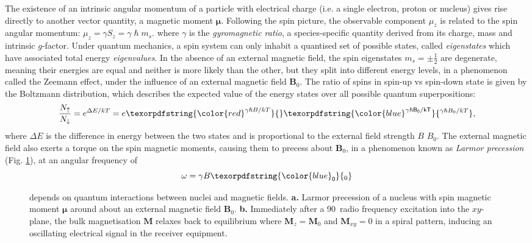 \documentclass[12pt,phd,a4paper,twoside]{ucl_thesis}
\providecommand{\DIFaddtex}[1]{{\protect\color{blue} \sf #1}} %
\providecommand{\DIFdeltex}[1]{{\protect\color{red} \scriptsize #1}} %
\providecommand{\DIFaddbegin}{} %
\providecommand{\DIFaddend}{} %
\providecommand{\DIFdelbegin}{} %
\providecommand{\DIFdelend}{} %
\providecommand{\DIFaddFL}[1]{\DIFadd{#1}} %
\providecommand{\DIFdelFL}[1]{\DIFdel{#1}} %
\providecommand{\DIFaddbeginFL}{} %
\providecommand{\DIFaddendFL}{} %
\providecommand{\DIFdelbeginFL}{} %
\providecommand{\DIFdelendFL}{} %
\providecommand{\DIFadd}[1]{\texorpdfstring{\DIFaddtex{#1}}{#1}} %
\providecommand{\DIFdel}[1]{\texorpdfstring{\DIFdeltex{#1}}{}} %
\newcommand{\DIFscaledelfig}{0.5}
\newlength{\DIFdelgraphicswidth} %
\newlength{\DIFdelgraphicsheight} %
\newcommand{\DIFaddincludegraphics}[2][]{{\color{blue}\fbox{\DIFOincludegraphics[#1]{#2}}}} %
\newcommand{\DIFdelincludegraphics}[2][]{%
\sbox{\DIFdelgraphicsbox}{\DIFOincludegraphics[#1]{#2}}%
\settoboxwidth{\DIFdelgraphicswidth}{\DIFdelgraphicsbox} %
\settoboxtotalheight{\DIFdelgraphicsheight}{\DIFdelgraphicsbox} %
\scalebox{\DIFscaledelfig}{%
\parbox[b]{\DIFdelgraphicswidth}{\usebox{\DIFdelgraphicsbox}\\[-\baselineskip] \rule{\DIFdelgraphicswidth}{0em}}\llap{\resizebox{\DIFdelgraphicswidth}{\DIFdelgraphicsheight}{%
\setlength{\unitlength}{\DIFdelgraphicswidth}%
\begin{picture}(1,1)%
\thicklines\linethickness{2pt} %
{\color[rgb]{1,0,0}\put(0,0){\framebox(1,1){}}}%
{\color[rgb]{1,0,0}\put(0,0){\line( 1,1){1}}}%
{\color[rgb]{1,0,0}\put(0,1){\line(1,-1){1}}}%
\end{picture}%
}\hspace*{3pt}}} %
} %
\DeclareRobustCommand{\DIFaddbegin}{\DIFOaddbegin \let\includegraphics\DIFaddincludegraphics} %
\DeclareRobustCommand{\DIFaddend}{\DIFOaddend \let\includegraphics\DIFOincludegraphics} %
\DeclareRobustCommand{\DIFdelbegin}{\DIFOdelbegin \let\includegraphics\DIFdelincludegraphics} %
\DeclareRobustCommand{\DIFdelend}{\DIFOaddend \let\includegraphics\DIFOincludegraphics} %
\DeclareRobustCommand{\DIFaddbeginFL}{\DIFOaddbeginFL \let\includegraphics\DIFaddincludegraphics} %
\DeclareRobustCommand{\DIFaddendFL}{\DIFOaddendFL \let\includegraphics\DIFOincludegraphics} %
\DeclareRobustCommand{\DIFdelbeginFL}{\DIFOdelbeginFL \let\includegraphics\DIFdelincludegraphics} %
\DeclareRobustCommand{\DIFdelendFL}{\DIFOaddendFL \let\includegraphics\DIFOincludegraphics} %
\begin{document}
The existence of an intrinsic angular momentum of a particle with electrical charge (i.e. a single electron, proton or nucleus) gives rise directly to another vector quantity, a magnetic moment $\bm{\mu}$.
Following the spin picture, the observable component $\mu_z$ is related to the spin angular momentum: $\mu_z = \gamma S_z = \gamma \hslash m_s $.
where $\gamma$ is the \textit{gyromagnetic ratio}, a species-specific quantity derived from its charge, mass and intrinsic $g$-factor.
Under quantum mechanics, a spin system can only inhabit a quantised set of possible states, called \textit{eigenstates} which have associated total energy \textit{eigenvalues}.
In the absence of an external magnetic field, the spin eigenstates $m_s = \pm \frac{1}{2}$ are degenerate, meaning their energies are equal and neither is more likely than the other, but they split into different energy levels, in a phenomenon called the Zeemann effect, under the influence of an external magnetic field $\mathbf{B}_0$.
The ratio of spins in spin-up vs spin-down state is given by the Boltzmann distribution, which describes the expected value of the energy states over all possible quantum superpositions:
\begin{align}
  \frac{N_{\uparrow}}{N_{\downarrow}} = e^{\Delta E / k T} = e\DIFdelbegin \DIFdel{^{\gamma \hslash B / k T}}\DIFdelend \DIFaddbegin \DIFadd{^{\gamma \hslash B_0 / k T}}\DIFaddend , \label{eq:boltzmann}
\end{align}
where $\Delta E$ is the difference in energy between the two states and is proportional to the external field strength \DIFdelbegin \DIFdel{$B$}\DIFdelend \DIFaddbegin \DIFadd{$B_0$}\DIFaddend .
The external magnetic field also exerts a torque on the spin magnetic moments, causing them to precess about $\mathbf{B}_0$, in a phenomenon known as \textit{Larmor precession} (Fig. \ref{fig:larmor}), at an angular frequency of
\begin{equation}
  \omega = \gamma B\DIFaddbegin \DIFadd{_0
}\DIFaddend \end{equation}

\begin{figure}
    \centering
    \qquad 
  \caption[Larmor precession and magnetisation relaxation]{ depends on quantum interactions between nuclei and magnetic fields.
  \textbf{\sffamily a.} Larmor precession of \DIFaddbeginFL \DIFaddFL{a }\DIFaddendFL nucleus with spin magnetic moment $\bm{\mu}$ \DIFdelbeginFL \DIFdelFL{around }\DIFdelendFL \DIFaddbeginFL \DIFaddFL{about an }\DIFaddendFL external magnetic field $\mathbf{B}_0$.
  \textbf{\sffamily b.} Immediately after a 90\textdegree\ radio frequency excitation into the $xy$-plane, the bulk magnetisation $\mathbf{M}$ relaxes back to equilibrium where $\mathbf{M}_z=\mathbf{M}_0$ and $\mathbf{M}_{xy}=0$ in a spiral pattern, inducing an oscillating electrical signal in the  receiver equipment.}\label{fig:larmor}
\end{figure}
\end{document}
